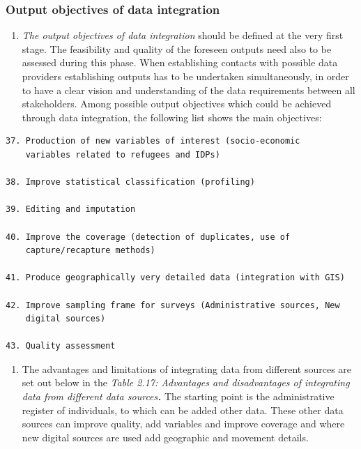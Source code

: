\documentclass[
]{article}
\providecommand{\tightlist}{%
  \setlength{\itemsep}{0pt}\setlength{\parskip}{0pt}}
\begin{document}
\hypertarget{d.1.-output-objectives-of-data-integration}{%
\subsubsection{Output objectives of data integration}\label{d.1.-output-objectives-of-data-integration}}

\begin{enumerate}
\def\labelenumi{\arabic{enumi}.}
\setcounter{enumi}{200}
\tightlist
\item
  \emph{The output objectives of data integration} should be defined at
  the very first stage. The feasibility and quality of the foreseen
  outputs need also to be assessed during this phase. When
  establishing contacts with possible data providers establishing
  outputs has to be undertaken simultaneously, in order to have a
  clear vision and understanding of the data requirements between all
  stakeholders. Among possible output objectives which could be
  achieved through data integration, the following list shows the main
  objectives:
\end{enumerate}

\begin{verbatim}
37. Production of new variables of interest (socio-economic
    variables related to refugees and IDPs)

38. Improve statistical classification (profiling)

39. Editing and imputation

40. Improve the coverage (detection of duplicates, use of
    capture/recapture methods)

41. Produce geographically very detailed data (integration with GIS)

42. Improve sampling frame for surveys (Administrative sources, New
    digital sources)

43. Quality assessment
\end{verbatim}

\begin{enumerate}
\def\labelenumi{\arabic{enumi}.}
\setcounter{enumi}{201}
\tightlist
\item
  The advantages and limitations of integrating data from different
  sources are set out below in the \emph{Table 2.17: Advantages and
  disadvantages of integrating data from different data sources\textbf{.}}
  The starting point is the administrative register of individuals, to
  which can be added other data. These other data sources can improve
  quality, add variables and improve coverage and where new digital
  sources are used add geographic and movement details.
\end{enumerate}
\end{document}
